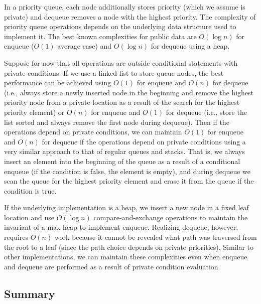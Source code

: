 \documentclass[11pt]{article}
\begin{document}
In a priority queue, each node additionally stores priority (which we assume
is private) and dequeue removes a node with the highest priority. The
complexity of priority queue operations depends on the underlying data
structure used to implement it. The best known complexities for public data
are $O(\log n)$ for enqueue ($O(1)$ average case) and $O(\log n)$ for
dequeue using a heap.

Suppose for now that all operations are outside conditional statements with
private conditions. If we use a linked list to store queue nodes, the best
performance can be achieved using $O(1)$ for enqueue and $O(n)$ for dequeue
(i.e., always store a newly inserted node in the beginning and remove the
highest priority node from a private location as a result of the search for
the highest priority element) or $O(n)$ for enqueue and $O(1)$ for dequeue
(i.e., store the list sorted and always remove the first node during
dequeue). Then if the operations depend on private conditions, we can
maintain $O(1)$ for enqueue and $O(n)$ for dequeue if the operations depend
on private conditions using a very similar approach to that of regular
queues and stacks. That is, we always insert an element into the beginning
of the queue as a result of a conditional enqueue (if the condition is
false, the element is empty), and during dequeue we scan the queue for the
highest priority element and erase it from the queue if the condition is
true.

If the underlying implementation is a heap, we insert a new node in a fixed
leaf location and use $O(\log n)$ compare-and-exchange operations to
maintain the invariant of a max-heap to implement enqueue. Realizing
dequeue, however, requires $O(n)$ work because it cannot be revealed what
path was traversed from the root to a leaf (since the path choice depends on
private priorities). Similar to other implementations, we can maintain these
complexities even when enqueue and dequeue are performed as a result of
private condition evaluation.

\subsection{Summary}
\end{document}
